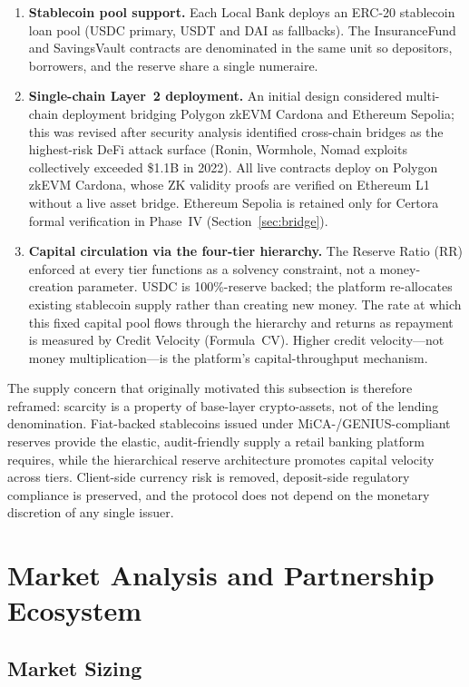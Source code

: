 \documentclass[12pt,a4paper]{report}
\begin{document}
\begin{enumerate}[noitemsep]
\item \textbf{Stablecoin pool support.} Each Local Bank deploys an ERC-20 stablecoin loan pool (USDC primary, USDT and DAI as fallbacks). The InsuranceFund and SavingsVault contracts are denominated in the same unit so depositors, borrowers, and the reserve share a single numeraire.
\item \textbf{Single-chain Layer~2 deployment.} An initial design considered multi-chain deployment bridging Polygon zkEVM Cardona and Ethereum Sepolia; this was revised after security analysis identified cross-chain bridges as the highest-risk DeFi attack surface (Ronin, Wormhole, Nomad exploits collectively exceeded \$1.1B in 2022). All live contracts deploy on Polygon zkEVM Cardona, whose ZK validity proofs are verified on Ethereum L1 without a live asset bridge. Ethereum Sepolia is retained only for Certora formal verification in Phase~IV (Section~\ref{sec:bridge}).
\item \textbf{Capital circulation via the four-tier hierarchy.} The Reserve Ratio (RR) enforced at every tier functions as a solvency constraint, not a money-creation parameter. USDC is 100\%-reserve backed; the platform re-allocates existing stablecoin supply rather than creating new money. The rate at which this fixed capital pool flows through the hierarchy and returns as repayment is measured by Credit Velocity (Formula~CV). Higher credit velocity---not money multiplication---is the platform's capital-throughput mechanism.
\end{enumerate}

The supply concern that originally motivated this subsection is therefore reframed: scarcity is a property of base-layer crypto-assets, not of the lending denomination. Fiat-backed stablecoins issued under MiCA-/GENIUS-compliant reserves provide the elastic, audit-friendly supply a retail banking platform requires, while the hierarchical reserve architecture promotes capital velocity across tiers. Client-side currency risk is removed, deposit-side regulatory compliance is preserved, and the protocol does not depend on the monetary discretion of any single issuer.

\section{Market Analysis and Partnership Ecosystem}

\subsection{Market Sizing}
\end{document}

